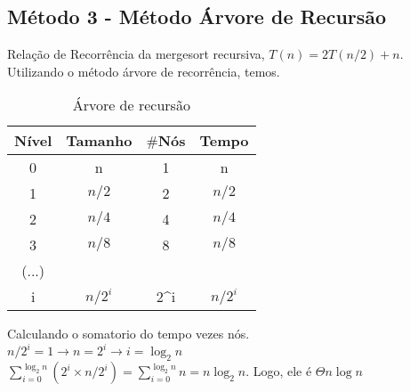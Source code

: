 \subsection{Método 3 - Método Árvore de Recursão}
Relação de Recorrência da mergesort recursiva, $T(n) = 2T(n/2) + n$. Utilizando o método árvore de recorrência, temos.

\begin{table}[ht!]
    \centering
    \begin{tabular}{|c|c|c|c|}
    \hline
    \textbf{Nível} & \textbf{Tamanho} & $\#$\textbf{Nós} & \textbf{Tempo} \\ \hline
     0 & n & 1 & n \\ \hline
     1 & $n/2$ & 2 & $n/2$ \\ \hline
     2 & $n/4$ & 4 & $n/4$ \\ \hline
     3 & $n/8$ & 8 & $n/8$ \\ \hline
     (...) & & & \\ \hline
     i & $n/2^i$ & 2^i & $n/2^i$ \\ \hline 
    \end{tabular}  
    \caption{Árvore de recursão}
\end{table}

Calculando o somatorio do tempo vezes nós. \\
$n/2^i = 1 \rightarrow n = 2^i \rightarrow i = \log_2{n}$ \\
$\sum_{i=0}^{\log_2{n}} (2^i \times n/2^i) = \sum_{i=0}^{\log_2{n}} n = n \log_2{n}$. Logo, ele é $\Theta n \log{n}$ 